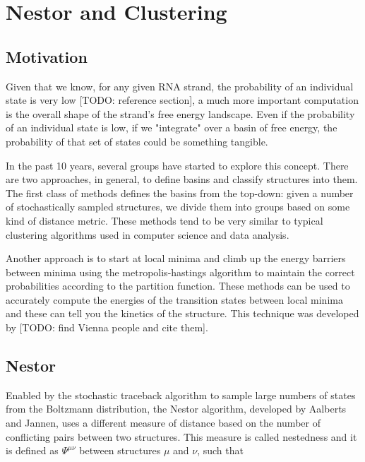 \chapter{Nestor and Clustering}
\section{Motivation}

Given that we know, for any given RNA strand, the probability of an
individual state is very low [TODO: reference section], a much more
important computation is the overall shape of the strand's free energy
landscape. Even if the probability of an individual state is low, if
we "integrate" over a basin of free energy, the probability of that
set of states could be something tangible.

In the past 10 years, several groups have started to explore this
concept. There are two approaches, in general, to define basins and
classify structures into them. The first class of methods defines the
basins from the top-down: given a number of stochastically sampled
structures, we divide them into groups based on some kind of distance
metric. These methods tend to be very similar to typical clustering
algorithms used in computer science and data analysis.

Another approach is to start at local minima and climb up the energy
barriers between minima using the metropolis-hastings algorithm to
maintain the correct probabilities according to the partition
function. These methods can be used to accurately compute the energies
of the transition states between local minima and these can tell you
the kinetics of the structure. This technique was developed by [TODO:
find Vienna people and cite them].

\section{Nestor}

Enabled by the stochastic traceback algorithm to sample large numbers
of states from the Boltzmann distribution, the Nestor algorithm,
developed by Aalberts and Jannen, uses a different measure of
distance based on the number of conflicting pairs between two
structures. This measure is called nestedness and it is defined as
$\Psi^{\mu\nu}$ between structures $\mu$ and $\nu$, such that

